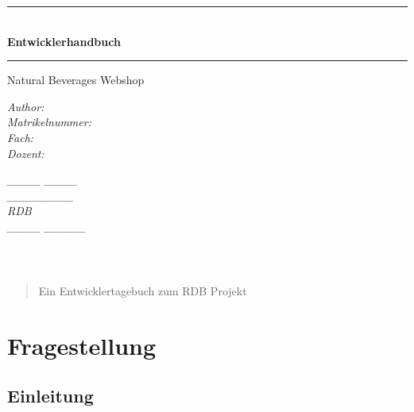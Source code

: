 \documentclass[a4paper, 11pt]{article}
\begin{document}
\newpage


\begin{verbatim}




\end{verbatim}
\begin{center}


\newcommand{\HRule}{\rule{\linewidth}{0.5mm}}
\HRule \\[0.4cm]
{ \huge \bfseries Entwicklerhandbuch}
\HRule

\Large{Natural Beverages Webshop} \\[1cm]

\begin{minipage}{0.55\textwidth}
\begin{flushleft} \large
\emph{Author:} \\
\emph{Matrikelnummer:} \\
\emph{Fach:} \\
\emph{Dozent:}
\end{flushleft}
\end{minipage}
\hfill
\begin{minipage}{0.4\textwidth}
\begin{flushright} \large
\emph{____ \textsc{____}} \\
\emph{________} \\
\emph{RDB} \\
\emph{____ \textsc{_____}}
\end{flushright}
\end{minipage}
\end{center}
\begin{verbatim}



\end{verbatim}

\begin{abstract}
\noindent %
Ein Entwicklertagebuch zum RDB Projekt \\ [1cm]
\end{abstract}

\newpage

\tableofcontents
\listoffigures

\newpage
\section{Fragestellung}
\subsection{Einleitung}
\end{document}
